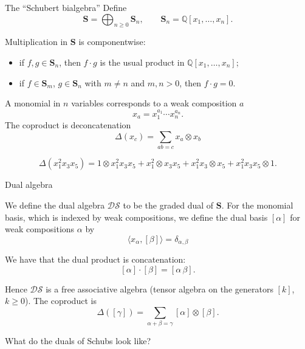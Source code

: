 \documentclass[aspectratio=169]{beamer}
\newcommand{\coma}{\mathbf{S}}
\newcommand{\dcoma}{\mathcal{DS}}
\newcommand{\wb}[1]{\left[#1\right]}
\begin{document}
\begin{frame}{The ``Schubert bialgebra''}
Define
\[
\coma = \bigoplus_{n\ge 0} \coma_n,
\qquad \coma_n = \mathbb{Q}[x_1,\dots,x_n].
\]

Multiplication in $\coma$ is componentwise:
\begin{itemize}
  \item if $f,g\in \coma_n$, then $f\cdot g$ is the usual product in $\mathbb{Q}[x_1,\dots,x_n]$;
  \item if $f\in \coma_m$, $g\in \coma_n$ with $m\neq n$ and $m,n>0$, then $f\cdot g=0$.
\end{itemize}

A monomial in $n$ variables corresponds to a weak composition $a$
$$x_a = x_1^{a_1}\cdots x_n^{a_n}.$$
The coproduct is deconcatenation
\[\Delta(x_c) = \sum_{ab = c} x_a \otimes x_b\]


$$\Delta(x_1^2x_3x_5) = 1\otimes x_1^2x_3x_5 + x_1^2\otimes x_3x_5 + x_1^2x_3\otimes x_5 + x_1^2x_3x_5\otimes 1.$$
\end{frame}

\begin{frame}{Dual algebra}

We define the dual algebra $\dcoma$ to be the graded dual of $\coma$. For the monomial basis, which is indexed by weak compositions, we define the dual basis $[\alpha]$ for weak compositions $\alpha$ by 
$$\langle x_\alpha, [\beta]\rangle = \delta_{\alpha,\beta}$$

We have that the dual product is concatenation:
\[
\wb{\alpha}\cdot \wb{\beta} = \wb{\alpha\,\beta}.
\]

Hence $\dcoma$ is a free associative algebra (tensor algebra on the generators $\wb{k}$, $k\ge 0$). The coproduct is
\[\Delta(\wb{\gamma}) = \sum_{\alpha + \beta=\gamma} \wb{\alpha} \otimes \wb{\beta}.\]

What do the duals of Schubs look like?
\end{frame}
\end{document}
